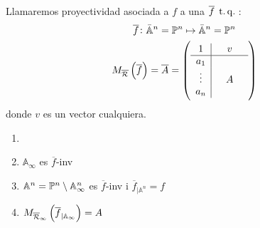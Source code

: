 \begin{defi}
    Llamaremos proyectividad asociada a $f$ a una $\overline{f} \operatorname{\;t.q.\;}$:
    \begin{gather*}
        \overline{f} \colon \bar{\mathbb{A}}^n = \mathbb{P}^n \mapsto \bar{\mathbb{A}}^n = \mathbb{P}^n \\
        M_{\overline{\mathcal{R}}}\left( \overline{f}\right) = \overline{A} = 
        \left(
        \begin{array}{c|ccc}
            1 &  & v & \\ \hline
            a_1 & & & \\
            \vdots & & A & \\
            a_n & & & 
        \end{array} \right) \\ 
    \end{gather*}
    donde $v$ es un vector cualquiera.
\end{defi}
\begin{prop}
    \begin{enumerate}
        \item[]
        \item $\mathbb{A}_\infty$ es $\overline{f}$-inv
        \item $\mathbb{A}^n = \mathbb{P}^n \setminus \mathbb{A}_\infty^n$ es $\overline{f}$-inv i $\overline{f}_{|\mathbb{A}^n}=f$
        \item $M_{\overline{\mathcal{R}}_\infty}\left( \overline{f}_{|\mathbb{A}_\infty} \right) = A$
    \end{enumerate}
\end{prop}


